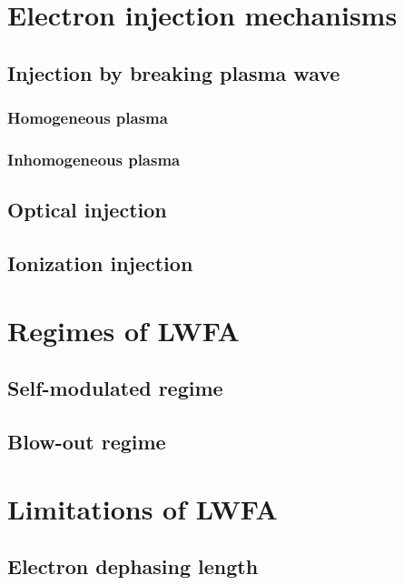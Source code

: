 \documentclass[10pt, twoside, a4paper, openright]{report}
\begin{document}
\section{Electron injection mechanisms}
%

\subsection{Injection by breaking plasma wave}
%

\subsubsection{Homogeneous plasma}
%

\subsubsection{Inhomogeneous plasma}
%

\subsection{Optical injection}
%

\subsection{Ionization injection}
%

\section{Regimes of LWFA}
%

\subsection{Self-modulated regime}

\subsection{Blow-out regime}

\section{Limitations of LWFA}
%

\subsection{Electron dephasing length}
\end{document}
